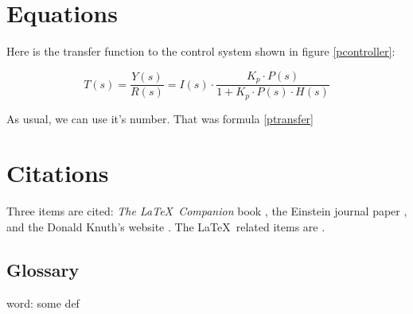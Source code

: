 \documentclass[12pt]{article}
\begin{document}
	\section{Equations}

	Here is the transfer function to the control system shown in figure \ref{pcontroller}:

    \begin{equation}
        \label{ptransfer}
        T(s)=\frac{Y(s)}{R(s)}=I(s) \cdot \frac{K_p \cdot P(s)}{1 + K_p \cdot P(s) \cdot H(s)}
    \end{equation}

	As usual, we can use it's number. That was formula \eqref{ptransfer}

	\section{Citations}

	Three items are cited: \textit{The \LaTeX\ Companion} book \cite{latexcompanion}, the Einstein journal paper \cite{einstein}, and the Donald Knuth's website \cite{knuthwebsite}. The \LaTeX\ related items are \cite{latexcompanion,knuthwebsite}.

    \newpage
    \startappendixtitles
    \begin{appendices}

    \section{Glossary}

        word: some def

    \end{appendices}
    \finishappendixtitles


	
\end{document}
